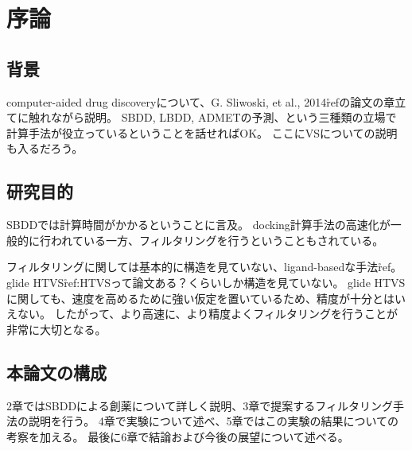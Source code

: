 \chapter{序論}
\section{背景}
computer-aided drug discoveryについて、G. Sliwoski, et al., 2014\r{ref}の論文の章立てに触れながら説明。
SBDD, LBDD, ADMETの予測、という三種類の立場で計算手法が役立っているということを話せればOK。
ここにVSについての説明も入るだろう。


\section{研究目的}
SBDDでは計算時間がかかるということに言及。
docking計算手法の高速化が一般的に行われている一方、フィルタリングを行うということもされている。

フィルタリングに関しては基本的に構造を見ていない、ligand-basedな手法\r{ref}。glide HTVS\r{ref:HTVSって論文ある？}くらいしか構造を見ていない。
glide HTVSに関しても、速度を高めるために強い仮定を置いているため、精度が十分とはいえない。
したがって、より高速に、より精度よくフィルタリングを行うことが非常に大切となる。

\section{本論文の構成}
2章ではSBDDによる創薬について詳しく説明、3章で提案するフィルタリング手法の説明を行う。
4章で実験について述べ、5章ではこの実験の結果についての考察を加える。
最後に6章で結論および今後の展望について述べる。